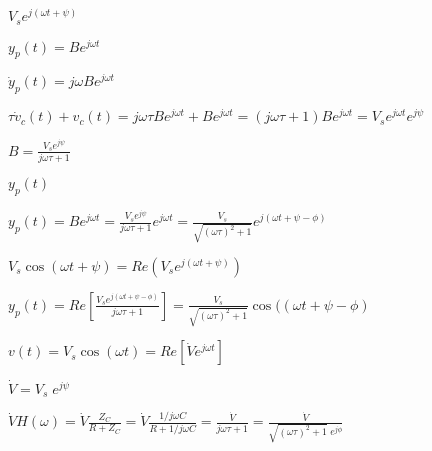 \documentclass{article}
\def\lthtmlcheckvsize{\ifdim\ht\sizebox<\vsize 
  \ifdim\wd\sizebox<\hsize\expandafter\hfill\fi \expandafter\vfill
  \else\expandafter\vss\fi}%
\begin{document}
{\newpage\clearpage
{}%
$ V_s e^{j(\omega t+\psi)}$%
\lthtmlindisplaymathZ
\lthtmlcheckvsize\clearpage}

{\newpage\clearpage
{}%
$ y_p(t)=B e^{j\omega t}$%
\lthtmlindisplaymathZ
\lthtmlcheckvsize\clearpage}

{\newpage\clearpage
{}%
$ \dot{y}_p(t)=j\omega B e^{j\omega t}$%
\lthtmlindisplaymathZ
\lthtmlcheckvsize\clearpage}

{\newpage\clearpage
{}%
$\displaystyle \tau\dot{v}_c(t)+v_c(t)=j\omega\tau Be^{j\omega t}+Be^{j\omega t}
=(j\omega\tau +1) B e^{j\omega t} =V_s e^{j\omega t} e^{j\psi}$%
\lthtmlindisplaymathZ
\lthtmlcheckvsize\clearpage}

{\newpage\clearpage
{}%
$\displaystyle B=\frac{V_s e^{j\psi}}{j\omega\tau+1}$%
\lthtmlindisplaymathZ
\lthtmlcheckvsize\clearpage}

{\newpage\clearpage
{}%
$ y_p(t)$%
\lthtmlindisplaymathZ
\lthtmlcheckvsize\clearpage}

{\newpage\clearpage
{}%
$\displaystyle y_p(t)=B e^{j\omega t}=\frac{V_s e^{j\psi}}{j\omega\tau+1} e^{j\omega t}
=\frac{V_s}{\sqrt{(\omega\tau)^2+1}}e^{j(\omega t+\psi-\phi)}$%
\lthtmlindisplaymathZ
\lthtmlcheckvsize\clearpage}

{\newpage\clearpage
{}%
$ V_s\cos(\omega t+\psi)=Re(V_s e^{j(\omega t+\psi)})$%
\lthtmlindisplaymathZ
\lthtmlcheckvsize\clearpage}

{\newpage\clearpage
{}%
$\displaystyle y_p(t)=Re\left[\frac{V_s e^{j(\omega t+\psi-\phi)}}{j\omega\tau+1}\right]
=\frac{V_s}{\sqrt{(\omega\tau)^2+1}}\cos((\omega t+\psi-\phi)$%
\lthtmlindisplaymathZ
\lthtmlcheckvsize\clearpage}

{\newpage\clearpage
{}%
$\displaystyle v(t)=V_s \cos(\omega t)=Re[\dot{V} e^{j\omega t}]$%
\lthtmlindisplaymathZ
\lthtmlcheckvsize\clearpage}

{\newpage\clearpage
{}%
$ \dot{V}=V_s\; e^{j\psi}$%
\lthtmlindisplaymathZ
\lthtmlcheckvsize\clearpage}

{\newpage\clearpage
{}%
$\displaystyle \dot{V} H(\omega)=\dot{V} \frac{Z_C}{R+Z_C}
=\dot{V} \frac{1/j\omega C}{R+1/j\omega C}=\frac{\dot{V}}{j\omega \tau+1}
=\frac{\dot{V}}{\sqrt{(\omega \tau)^2+1}\;e^{j\phi}}$%
\lthtmlindisplaymathZ
\lthtmlcheckvsize\clearpage}
\end{document}
